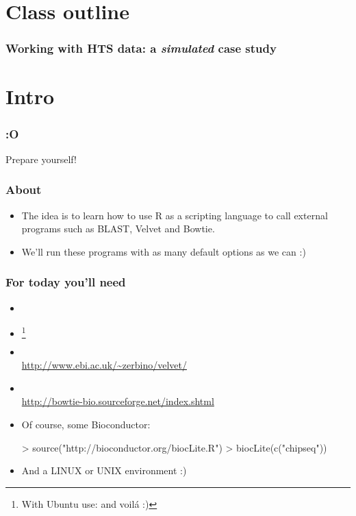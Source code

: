 




\usepackage{Sweave}


\begin{frame}[allowframebreaks]
  \titlepage
\end{frame}

\section*{Class outline}

\begin{frame}[allowframebreaks]
  \frametitle{Working with HTS data: a \emph{simulated} case study}
  \tableofcontents[hideallsubsections]
\end{frame}

\section{Intro}

\begin{frame}[allowframebreaks]
  \frametitle{:O}
  Prepare yourself!
\end{frame}

\begin{frame}[allowframebreaks]
  \frametitle{About}
  \begin{itemize}
  \item The idea is to learn how to use R as a scripting language to call external programs such as BLAST, Velvet and Bowtie.
  \item We'll run these programs with as many default options as we can :)
  \end{itemize}
\end{frame}

\begin{frame}
  \frametitle{For today you'll need}
  \begin{itemize}
  \item {}
  \item {}\footnote{With Ubuntu use:  and voilá :)}
  \item {} \\ \url{http://www.ebi.ac.uk/~zerbino/velvet/}
  \item {} \\ \url{http://bowtie-bio.sourceforge.net/index.shtml}
  \item Of course, some Bioconductor:
\begin{Schunk}
\begin{Sinput}
> source("http://bioconductor.org/biocLite.R")
> biocLite(c("chipseq"))
\end{Sinput}
\end{Schunk}
  \item And a LINUX or UNIX environment :)
  \end{itemize}
\end{frame}

